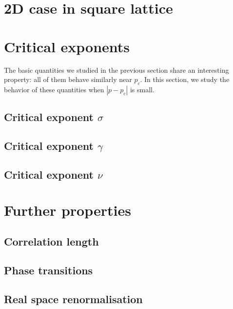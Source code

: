 \section{2D case in square lattice}\label{sec:2dsquare}


\section{Critical exponents}

The basic quantities we studied in the previous section share an interesting property: all of them behave similarly near $p_c$. In this section, we study the behavior of these quantities when $|p - p_c|$ is small.

\subsection{Critical exponent $\sigma$}

\subsection{Critical exponent $\gamma$}

\subsection{Critical exponent $\nu$}


\section{Further properties}


\subsection{Correlation length}

\subsection{Phase transitions}

\subsection{Real space renormalisation}




